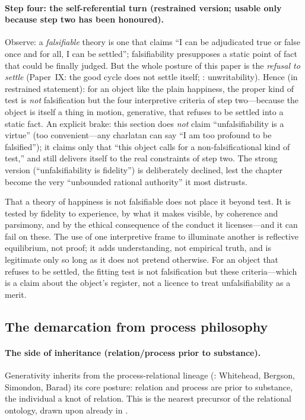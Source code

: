 \paragraph{Step four: the self-referential turn (restrained version; usable only because step two has been honoured).} Observe: a \emph{falsifiable} theory is one that claims ``I can be adjudicated true or false once and for all, I can be settled''; falsifiability presupposes a static point of fact that could be finally judged. But the whole posture of this paper is the \emph{refusal to settle} (Paper~IX: the good cycle does not settle itself; : unwritability). Hence (in restrained statement): for an object like the plain happiness, the proper kind of test is \emph{not} falsification but the four interpretive criteria of step two---because the object is itself a thing in motion, generative, that refuses to be settled into a static fact. An explicit brake: this section does \emph{not} claim ``unfalsifiability is a virtue'' (too convenient---any charlatan can say ``I am too profound to be falsified''); it claims only that ``this object calls for a non-falsificational kind of test,'' and still delivers itself to the real constraints of step two. The strong version (``unfalsifiability is fidelity'') is deliberately declined, lest the chapter become the very ``unbounded rational authority'' it most distrusts.

\begin{claim}
That a theory of happiness is not falsifiable does not place it beyond test. It is tested by fidelity to experience, by what it makes visible, by coherence and parsimony, and by the ethical consequence of the conduct it licenses---and it can fail on these. The use of one interpretive frame to illuminate another is reflective equilibrium, not proof; it adds understanding, not empirical truth, and is legitimate only so long as it does not pretend otherwise. For an object that refuses to be settled, the fitting test is not falsification but these criteria---which is a claim about the object's register, not a licence to treat unfalsifiability as a merit.
\end{claim}

\subsection{The demarcation from process philosophy}
\label{p19:sub:gen-process}

\paragraph{The side of inheritance (relation/process prior to substance).} Generativity inherits from the process-relational lineage (: Whitehead, Bergson, Simondon, Barad) its core posture: relation and process are prior to substance, the individual a knot of relation. This is the nearest precursor of the relational ontology, drawn upon already in .

